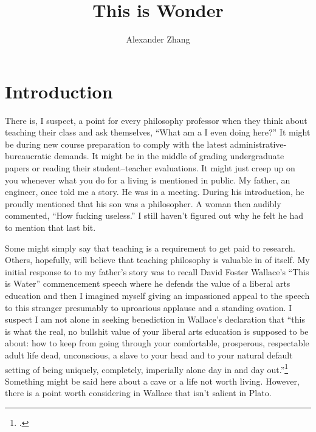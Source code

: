 \documentclass[letterpaper,notitlepage,12pt]{article}
\title{This is Wonder}
\author{Alexander Zhang}
\date{}
\begin{document}
\maketitle

\section{Introduction}

There is, I suspect, a point for every philosophy professor when they think
about teaching their class and ask themselves, ``What am a I even doing
here?''
It might be during new course preparation to comply with the latest
administrative-bureaucratic demands.
It might be in the middle of grading undergraduate papers or reading their
student--teacher evaluations.
It might just creep up on you whenever what you do for a living is mentioned in
public.
My father, an engineer, once told me a story.
He was in a meeting.
During his introduction, he proudly mentioned that his son was a philosopher.
A woman then audibly commented, ``How fucking useless.''
I still haven't figured out why he felt he had to mention that last bit.

Some might simply say that teaching is a requirement to get paid to research.
Others, hopefully, will believe that teaching philosophy is valuable in of
itself.
My initial response to to my father's story was to recall David Foster Wallace's
``This is Water'' commencement speech where he defends the value of a liberal
arts education and then I imagined myself giving an impassioned appeal to the
speech to this stranger presumably to uproarious applause and a standing 
ovation.
I suspect I am not alone in seeking benediction in Wallace's declaration that
``this is what the real, no bullshit value of your liberal arts education is
supposed to be about: how to keep from going through your comfortable,
prosperous, respectable adult life dead, unconscious, a slave to your head and
to your natural default setting of being uniquely, completely, imperially alone
day in and day out.''\footcite{david_foster_wallace_this_2005}
Something might be said here about a cave or a life not worth living.
However, there is a point worth considering in Wallace that isn't salient in
Plato.
\end{document}
